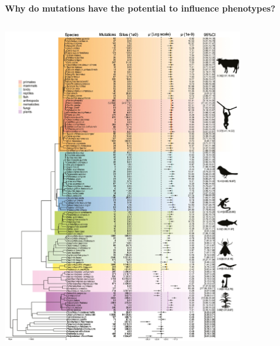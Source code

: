 \documentclass{beamer}
\begin{document}
\begin{frame}


\centering \Large \textbf{Why do mutations have the potential to influence phenotypes?} \\

\begin{columns}
	\begin{column}{0.5\textwidth}
		\centering	\includegraphics[keepaspectratio, width  = 0.8\textwidth]{img/mutationRates}\\
		\end{column}
	\begin{column}{0.5\textwidth}

\end{column}
\end{columns}
\end{frame}
\end{document}
